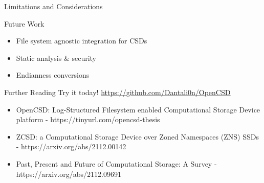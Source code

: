 \documentclass[aspectratio=169, notes]{beamer}
\begin{document}
\begin{frame}{Limitations and Considerations}
\end{frame}

\begin{frame}{Future Work}
	\begingroup
	\small
	\begin{itemize}
		\item File system agnostic integration for CSDs
		\item Static analysis \& security
		\item Endianness conversions
	\end{itemize}
	\endgroup
\end{frame}

\begin{frame}{Further Reading}
	\begingroup
	\small Try it today! \underline{\url{https://github.com/Dantali0n/OpenCSD}}
	\begin{itemize}
		\item OpenCSD: Log-Structured Filesystem enabled Computational
		Storage Device platform - https://tinyurl.com/opencsd-thesis
		\item ZCSD: a Computational Storage Device over Zoned Namespaces (ZNS)
			SSDs - https://arxiv.org/abs/2112.00142
		\item Past, Present and Future of Computational Storage: A Survey
			- https://arxiv.org/abs/2112.09691
	\end{itemize}
	\endgroup
\end{frame}
\end{document}
